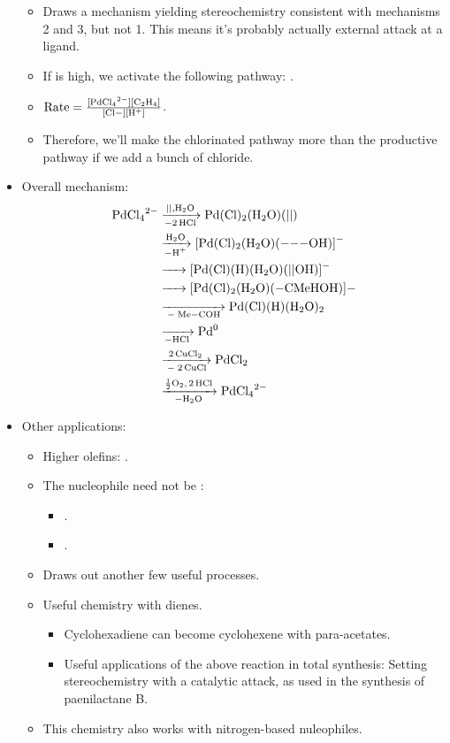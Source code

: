 \documentclass[../notes.tex]{subfiles}
\begin{document}
\begin{itemize}
\begin{itemize}
        \item Draws a mechanism yielding stereochemistry consistent with mechanisms 2 and 3, but not 1. This means it's probably actually external attack at a ligand.
        \item If \ce{[Cl^-]} is high, we activate the following pathway: .
        \item $\text{Rate}=\frac{\ce{[PdCl4^2-][C2H4]}}{\ce{[Cl-][H+]}}$.
        \item Therefore, we'll make the chlorinated pathway more than the productive pathway if we add a bunch of chloride.
    \end{itemize}
    \item Overall mechanism:
    \begin{align*}
        \ce{PdCl4^2-} &\ce{->[||, H2O][-2HCl]} \ce{Pd(Cl)2(H2O)(||)}\\
        &\ce{->[H2O][-H+]} \ce{[Pd(Cl)2(H2O)(---OH)]^-}\\
        &\ce{->} \ce{[Pd(Cl)(H)(H2O)(||OH)]-}\\
        &\ce{->} \ce{[Pd(Cl)2(H2O)(-CMeHOH)]-}\\
        &\ce{->[][- Me-COH]} \ce{Pd(Cl)(H)(H2O)2}\\
        &\ce{->[][-HCl]} \ce{Pd^0}\\
        &\ce{->[2CuCl2][- 2CuCl]} \ce{PdCl2}\\
        &\ce{->[\frac{1}{2}O2, 2HCl][-H2O]} \ce{PdCl4^2-}
    \end{align*}
    \item Other applications:
    \begin{itemize}
        \item Higher olefins: .
        \item The nucleophile need not be :
        \begin{itemize}
            \item {}.
            \item {}.
        \end{itemize}
        \item Draws out another few useful processes.
        \item Useful chemistry with dienes.
        \begin{itemize}
            \item Cyclohexadiene can become cyclohexene with para-acetates.
            \item Useful applications of the above reaction in total synthesis: Setting stereochemistry with a catalytic attack, as used in the synthesis of paenilactane B.
        \end{itemize}
        \item This chemistry also works with nitrogen-based nuleophiles.
    \end{itemize}
\end{itemize}
\end{document}
